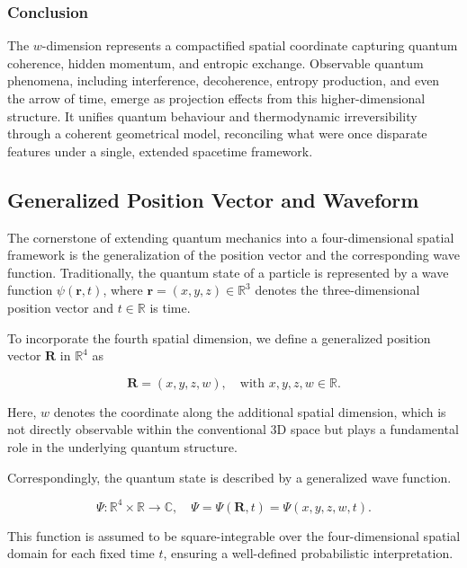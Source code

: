 \documentclass[12pt]{article}
\begin{document}
\subsubsection*{Conclusion}

The \(w\)-dimension represents a compactified spatial coordinate capturing quantum coherence, hidden momentum, and entropic exchange. Observable quantum phenomena, including interference, decoherence, entropy production, and even the arrow of time, emerge as projection effects from this higher-dimensional structure. It unifies quantum behaviour and thermodynamic irreversibility through a coherent geometrical model, reconciling what were once disparate features under a single, extended spacetime framework.


\subsection{Generalized Position Vector and Waveform}

The cornerstone of extending quantum mechanics into a four-dimensional spatial framework is the generalization of the position vector and the corresponding wave function. Traditionally, the quantum state of a particle is represented by a wave function \(\psi(\mathbf{r}, t)\), where \(\mathbf{r} = (x, y, z) \in \mathbb{R}^3\) denotes the three-dimensional position vector and \(t \in \mathbb{R}\) is time.

To incorporate the fourth spatial dimension, we define a generalized position vector \(\mathbf{R}\) in \(\mathbb{R}^4\) as

\begin{equation}
\mathbf{R} = (x, y, z, w), \quad \text{with } x, y, z, w \in \mathbb{R}.
\label{eq:4D_position_vector}
\end{equation}

Here, \(w\) denotes the coordinate along the additional spatial dimension, which is not directly observable within the conventional 3D space but plays a fundamental role in the underlying quantum structure.

Correspondingly, the quantum state is described by a generalized wave function.

\begin{equation}
\Psi: \mathbb{R}^4 \times \mathbb{R} \to \mathbb{C}, \quad \Psi = \Psi(\mathbf{R}, t) = \Psi(x, y, z, w, t).
\label{eq:4D_wave_function}
\end{equation}

This function is assumed to be square-integrable over the four-dimensional spatial domain for each fixed time \(t\), ensuring a well-defined probabilistic interpretation.
\end{document}
